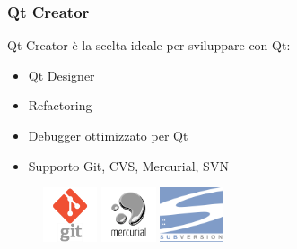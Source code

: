 \documentclass[10pt, aspectratio=169]{beamer}
\begin{document}
\begin{frame}
	\frametitle{Qt Creator}
	Qt Creator è la scelta ideale per sviluppare con Qt:
	\begin{itemize}
		\item Qt Designer
		\item Refactoring
		\item Debugger ottimizzato per Qt
		\item Supporto Git, CVS, Mercurial, SVN
	\end{itemize}
	\vspace{0.5cm}
	\begin{figure}
		\includegraphics[height=1.6cm]{images/git.png}
		\qquad
		\includegraphics[height=1.6cm]{images/hg.png}
		\qquad
		\includegraphics[height=1.6cm]{images/svn.png}
	\end{figure}
\end{frame}
\end{document}
